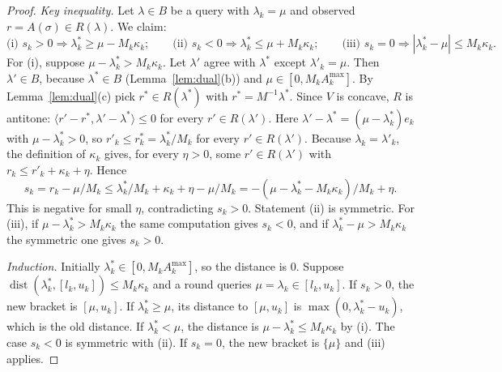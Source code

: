 \documentclass[11pt]{article}
\theoremstyle{definition}
\theoremstyle{remark}
\newcommand{\ip}[2]{\langle #1,#2\rangle}
\newcommand{\Amax}{A^{\max}}
\begin{document}
\begin{proof}
\emph{Key inequality.} Let $\lambda\in B$ be a query with $\lambda_k=\mu$ and observed $r=A(\sigma)\in R(\lambda)$. We claim:
\[\text{(i) } s_k>0\Rightarrow\lambda^*_k\ge\mu-M_k\kappa_k;\qquad\text{(ii) } s_k<0\Rightarrow\lambda^*_k\le\mu+M_k\kappa_k;\qquad\text{(iii) } s_k=0\Rightarrow|\lambda^*_k-\mu|\le M_k\kappa_k.\]
For (i), suppose $\mu-\lambda^*_k>M_k\kappa_k$. Let $\lambda'$ agree with $\lambda^*$ except $\lambda'_k=\mu$. Then $\lambda'\in B$, because $\lambda^*\in B$ (Lemma~\ref{lem:dual}(b)) and $\mu\in[0,M_k\Amax_k]$. By Lemma~\ref{lem:dual}(c) pick $r^*\in R(\lambda^*)$ with $r^*=M^{-1}\lambda^*$. Since $V$ is concave, $R$ is antitone: $\ip{r'-r^*}{\lambda'-\lambda^*}\le0$ for every $r'\in R(\lambda')$. Here $\lambda'-\lambda^*=(\mu-\lambda^*_k)e_k$ with $\mu-\lambda^*_k>0$, so $r'_k\le r^*_k=\lambda^*_k/M_k$ for every $r'\in R(\lambda')$. Because $\lambda_k=\lambda'_k$, the definition of $\kappa_k$ gives, for every $\eta>0$, some $r'\in R(\lambda')$ with $r_k\le r'_k+\kappa_k+\eta$. Hence
\[s_k=r_k-\mu/M_k\le\lambda^*_k/M_k+\kappa_k+\eta-\mu/M_k=-(\mu-\lambda^*_k-M_k\kappa_k)/M_k+\eta.\]
This is negative for small $\eta$, contradicting $s_k>0$. Statement (ii) is symmetric. For (iii), if $\mu-\lambda^*_k>M_k\kappa_k$ the same computation gives $s_k<0$, and if $\lambda^*_k-\mu>M_k\kappa_k$ the symmetric one gives $s_k>0$.

\emph{Induction.} Initially $\lambda^*_k\in[0,M_k\Amax_k]$, so the distance is $0$. Suppose $\operatorname{dist}(\lambda^*_k,[l_k,u_k])\le M_k\kappa_k$ and a round queries $\mu=\lambda_k\in[l_k,u_k]$. If $s_k>0$, the new bracket is $[\mu,u_k]$. If $\lambda^*_k\ge\mu$, its distance to $[\mu,u_k]$ is $\max(0,\lambda^*_k-u_k)$, which is the old distance. If $\lambda^*_k<\mu$, the distance is $\mu-\lambda^*_k\le M_k\kappa_k$ by (i). The case $s_k<0$ is symmetric with (ii). If $s_k=0$, the new bracket is $\{\mu\}$ and (iii) applies.
\end{proof}
\end{document}
